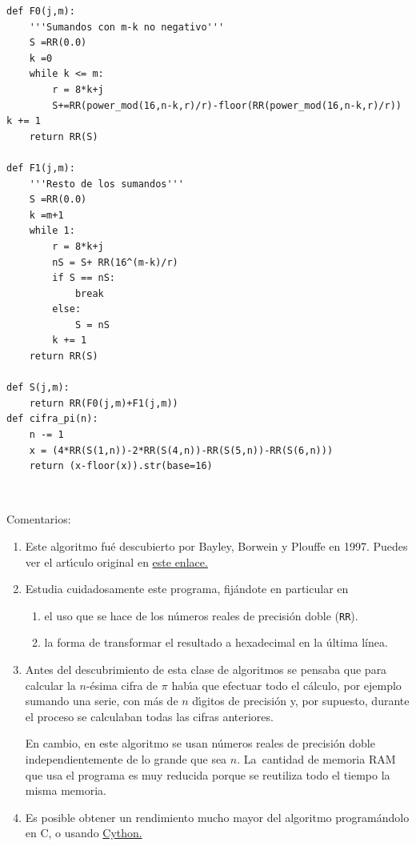  
 \begin{lstlisting}
def F0(j,m):
    '''Sumandos con m-k no negativo'''
    S =RR(0.0)
    k =0 
    while k <= m:
        r = 8*k+j
        S+=RR(power_mod(16,n-k,r)/r)-floor(RR(power_mod(16,n-k,r)/r))        k += 1
    return RR(S)  
 
def F1(j,m):
    '''Resto de los sumandos'''
    S =RR(0.0)
    k =m+1
    while 1:
        r = 8*k+j
        nS = S+ RR(16^(m-k)/r)
        if S == nS:
            break
        else:
            S = nS
        k += 1
    return RR(S)
    
def S(j,m):
    return RR(F0(j,m)+F1(j,m))
def cifra_pi(n):
    n -= 1
    x = (4*RR(S(1,n))-2*RR(S(4,n))-RR(S(5,n))-RR(S(6,n)))
    return (x-floor(x)).str(base=16)
\end{lstlisting}

\


{\sc Comentarios:}
 
 \begin{enumerate}
  \item Este algoritmo fu\'e descubierto por Bayley, Borwein y Plouffe en 1997.
Puedes ver el art\'{\i}culo original en
\href{http://150.244.21.37/PDFs/APROX/digits-BBP.pdf}{este enlace.}
  
  \item Estudia cuidadosamente este programa, fij\'andote en particular en 
  \begin{enumerate}
  \item el uso que se hace de los n\'umeros reales de precisi\'on doble ({\tt RR}). 
  \item la forma de transformar el resultado a hexadecimal en la \'ultima
l\'inea. 
  \end{enumerate}
\item Antes del descubrimiento de esta clase de algoritmos se pensaba que para
calcular la $n$-\'esima cifra de $\pi$ hab\'{\i}a que efectuar todo el
c\'alculo, por ejemplo sumando una serie,  con m\'as de $n$ d\'{\i}gitos de
precisi\'on y, por supuesto, durante el proceso se calculaban todas las cifras
anteriores. 

En cambio, en este algoritmo se usan n\'umeros reales de precisi\'on doble
independientemente de lo grande que sea $n$. La~cantidad de memoria RAM que usa
el programa es 
muy reducida porque se reutiliza todo el tiempo la misma memoria.

\item Es posible obtener un rendimiento mucho mayor del algoritmo
program\'andolo en C, o usando \hyperref[cython]{Cython.} 

\end{enumerate}
 
